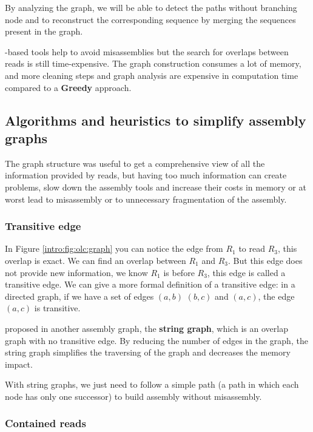 \documentclass[main]{subfiles}
\begin{document}
By analyzing the graph, we will be able to detect the paths without branching node and to reconstruct the corresponding sequence by merging the sequences present in the graph.

\OLC-based tools help to avoid misassemblies but the search for overlaps between reads is still time-expensive. The graph construction consumes a lot of memory, and more cleaning steps and graph analysis are expensive in computation time compared to a \textbf{Greedy} approach. 

\subsection{Algorithms and heuristics to simplify assembly graphs}

The graph structure was useful to get a comprehensive view of all the information provided by reads, but having too much information can create problems, slow down the assembly tools and increase their costs in memory or at worst lead to misassembly or to unnecessary fragmentation of the assembly.

\subsubsection{Transitive edge}  \label{intro:subsubsec:transitive_edge}

In Figure \ref{intro:fig:olc:graph} you can notice the edge from $R_1$ to read $R_3$, this overlap is exact. We can find an overlap between $R_1$ and $R_3$. But this edge does not provide new information, we know $R_1$ is before $R_3$, this edge is called a transitive edge. We can give a more formal definition of a transitive edge: in a directed graph, if we have a set of edges $(a, b)$ $(b, c)$ and $(a, c)$, the edge $(a, c)$ is transitive.

\citeauthor{string_graph} proposed in \cite{string_graph} another assembly graph, the \textbf{string graph}, which is an overlap graph with no transitive edge. By reducing the number of edges in the graph, the string graph simplifies the traversing of the graph and decreases the memory impact.

With string graphs, we just need to follow a simple path (a path in which each node has only one successor) to build assembly without misassembly.

\subsubsection{Contained reads} \label{intro:subsubsec:contained_reads}
\end{document}

